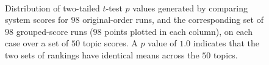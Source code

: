 \begin{figure}[t!]
\centering
{}
\\
\caption{Distribution of two-tailed $t$-test $p$ values generated by
comparing system scores for $98$ original-order runs, and the
corresponding set of $98$ grouped-score runs ($98$ points plotted in
each column), on each case over a set of $50$ topic scores.
A $p$ value of $1.0$ indicates that the two sets of rankings have
identical means across the $50$ topics.
\label{fig-rho-p-value}}
\end{figure}

